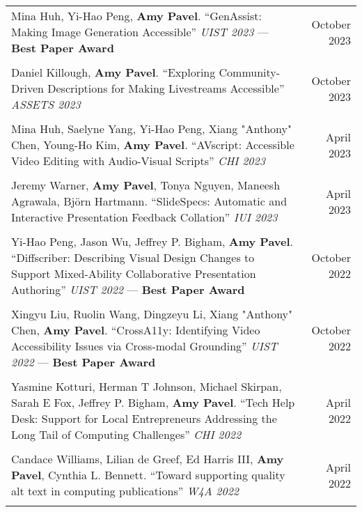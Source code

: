 \begin{longtable}{Xr}
	Mina Huh, Yi-Hao Peng, \textbf{Amy Pavel}. ``GenAssist: Making Image Generation Accessible'' \textit{UIST 2023} --- \textbf{Best Paper Award} & October 2023 \\
	\\

	Daniel Killough, \textbf{Amy Pavel}. ``Exploring Community-Driven Descriptions for Making Livestreams Accessible'' \textit{ASSETS 2023} & October 2023 \\
	\\

	Mina Huh, Saelyne Yang, Yi-Hao Peng, Xiang "Anthony" Chen, Young-Ho Kim, \textbf{Amy Pavel}. ``AVscript: Accessible Video Editing with Audio-Visual Scripts'' \textit{CHI 2023} & April 2023 \\
	\\

	Jeremy Warner, \textbf{Amy Pavel}, Tonya Nguyen, Maneesh Agrawala, Björn Hartmann. ``SlideSpecs: Automatic and Interactive Presentation Feedback Collation'' \textit{IUI 2023} & April 2023 \\
	\\

	Yi-Hao Peng, Jason Wu, Jeffrey P. Bigham, \textbf{Amy Pavel}. ``Diffscriber: Describing Visual Design Changes to Support Mixed-Ability Collaborative Presentation Authoring'' \textit{UIST 2022} --- \textbf{Best Paper Award} & October 2022 \\
	\\

	Xingyu Liu, Ruolin Wang, Dingzeyu Li, Xiang "Anthony" Chen, \textbf{Amy Pavel}. ``CrossA11y: Identifying Video Accessibility Issues via Cross-modal Grounding'' \textit{UIST 2022} --- \textbf{Best Paper Award} & October 2022 \\
	\\

	Yasmine Kotturi, Herman T Johnson, Michael Skirpan, Sarah E Fox, Jeffrey P. Bigham, \textbf{Amy Pavel}. ``Tech Help Desk: Support for Local Entrepreneurs Addressing the Long Tail of Computing Challenges'' \textit{CHI 2022} & April 2022 \\
	\\

	Candace Williams, Lilian de Greef, Ed Harris III, \textbf{Amy Pavel}, Cynthia L. Bennett. ``Toward supporting quality alt text in computing publications'' \textit{W4A 2022} & April 2022 \\
	\\


\end{longtable}
